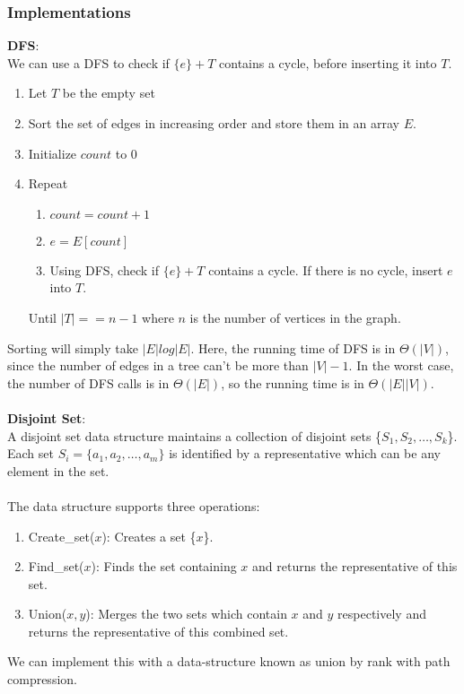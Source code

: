 \documentclass[a4paper]{article}
\begin{document}
\subsubsection{Implementations}
\textbf{DFS}:\\
We can use a DFS to check if $\{e\} + T$ contains a cycle, before inserting it into $T$.
\begin{enumerate} \itemsep0em
	\item Let $T$ be the empty set
	\item Sort the set of edges in increasing order and store them in an array $E$.
	\item Initialize $count$ to 0
	\item Repeat
	\begin{enumerate}
		\item $count = count + 1$
		\item $e = E[count]$
		\item Using DFS, check if $\{e\} + T$ contains a cycle. If there is no cycle, insert $e$ into $T$.
	\end{enumerate}
	Until $|T| == n-1$ where $n$ is the number of vertices in the graph.
\end{enumerate}
Sorting will simply take $|E| log |E|$. Here, the running time of DFS is in $\Theta(|V|)$, since the number of edges in a tree can't be more than $|V| - 1$. In the worst case, the number of DFS calls is in $\Theta(|E|)$, so the running time is in $\Theta(|E||V|)$.\\\\
\textbf{Disjoint Set}:\\
A disjoint set data structure maintains a collection of disjoint sets \{$S_1, S_2, \dots, S_k$\}. Each set $S_i = \{a_1,a_2,\dots,a_m\}$ is identified by a representative which can be any element in the set.\\\\
The data structure supports three operations:
\begin{enumerate}
	\item Create\_set($x$): Creates a set \{$x$\}.
	\item Find\_set($x$): Finds the set containing $x$ and returns the representative of this set.
	\item Union($x, y$): Merges the two sets which contain $x$ and $y$ respectively and returns the representative of this combined set.
\end{enumerate}
We can implement this with a data-structure known as union by rank with path compression.\\\\
\end{document}
